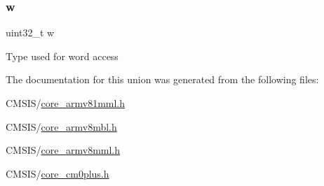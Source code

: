 \subsubsection{\texorpdfstring{w}{w}}
{\footnotesize\ttfamily uint32\+\_\+t w}

Type used for word access 

The documentation for this union was generated from the following files\+:\begin{DoxyCompactItemize}
\item 
C\+M\+S\+I\+S/\mbox{\hyperlink{core__armv81mml_8h}{core\+\_\+armv81mml.\+h}}\item 
C\+M\+S\+I\+S/\mbox{\hyperlink{core__armv8mbl_8h}{core\+\_\+armv8mbl.\+h}}\item 
C\+M\+S\+I\+S/\mbox{\hyperlink{core__armv8mml_8h}{core\+\_\+armv8mml.\+h}}\item 
C\+M\+S\+I\+S/\mbox{\hyperlink{core__cm0plus_8h}{core\+\_\+cm0plus.\+h}}\end{DoxyCompactItemize}
